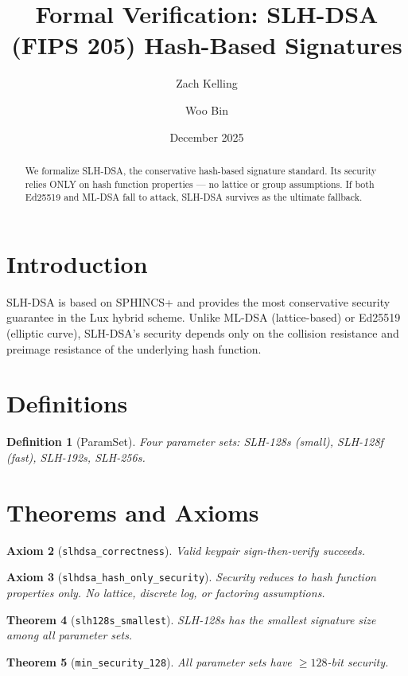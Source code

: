 \documentclass[11pt]{article}
\title{Formal Verification: SLH-DSA (FIPS 205) Hash-Based Signatures}
\author{Zach Kelling \and Woo Bin}
\date{December 2025}
\newtheorem{theorem}{Theorem}
\newtheorem{definition}[theorem]{Definition}
\newtheorem{axiom_stmt}[theorem]{Axiom}
\begin{document}
\maketitle

\begin{abstract}
We formalize SLH-DSA, the conservative hash-based signature standard. Its security relies ONLY on hash function properties --- no lattice or group assumptions. If both Ed25519 and ML-DSA fall to attack, SLH-DSA survives as the ultimate fallback.
\end{abstract}

\section{Introduction}
SLH-DSA is based on SPHINCS+ and provides the most conservative security guarantee in the Lux hybrid scheme. Unlike ML-DSA (lattice-based) or Ed25519 (elliptic curve), SLH-DSA's security depends only on the collision resistance and preimage resistance of the underlying hash function.

\section{Definitions}
\begin{definition}[ParamSet]
Four parameter sets: SLH-128s (small), SLH-128f (fast), SLH-192s, SLH-256s.
\end{definition}


\section{Theorems and Axioms}
\begin{axiom_stmt}[\texttt{slhdsa\_correctness}]
Valid keypair sign-then-verify succeeds.
\end{axiom_stmt}

\begin{axiom_stmt}[\texttt{slhdsa\_hash\_only\_security}]
Security reduces to hash function properties only. No lattice, discrete log, or factoring assumptions.
\end{axiom_stmt}

\begin{theorem}[\texttt{slh128s\_smallest}]
SLH-128s has the smallest signature size among all parameter sets.
\end{theorem}

\begin{theorem}[\texttt{min\_security\_128}]
All parameter sets have $\geq 128$-bit security.
\end{theorem}
\end{document}
